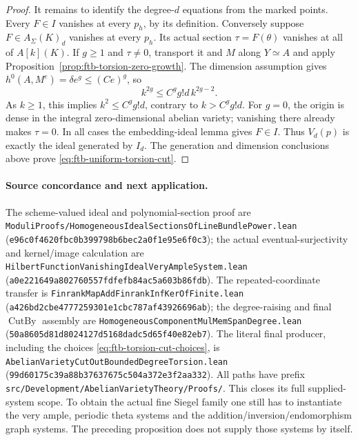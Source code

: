 \begin{proof}
It remains to identify the degree-\(d\) equations from
the marked points.
Every \(F\in I\) vanishes at every \(p_h\), by its
definition.
Conversely suppose \(F\in A_\Sigma(K)_d\) vanishes at
every \(p_h\).
Its actual section \(\tau=F(\theta)\) vanishes at all
of \(A[k](K)\).
If \(g\ge1\) and \(\tau\ne0\), transport it and \(M\)
along \(Y\simeq A\) and apply
Proposition~\ref{prop:ftb-torsion-zero-growth}.
The dimension assumption gives
\(h^0(A,M^e)=\delta e^g\le(Ce)^g\), so
\[
                       k^{2g}\le C^g g!d\,k^{2g-2}.
\]
As \(k\ge1\), this implies \(k^2\le C^g g!d\),
contrary to \(k>C^g g!d\).
For \(g=0\), the origin is dense in the integral
zero-dimensional abelian variety; vanishing there
already makes \(\tau=0\).
In all cases the embedding-ideal lemma gives \(F\in I\).
Thus \(V_d(p)\) is exactly the ideal generated by \(I_d\).
The generation and dimension conclusions above prove
\eqref{eq:ftb-uniform-torsion-cut}.
\end{proof}

\paragraph{Source concordance and next application.}
The scheme-valued ideal and polynomial-section proof are
\texttt{ModuliProofs/HomogeneousIdealSectionsOfLineBundlePower.lean}
(\texttt{e96c0f4620fbc0b399798b6bec2a0f1e95e6f0c3});
the actual eventual-surjectivity and kernel/image calculation are
\texttt{HilbertFunctionVanishingIdealVeryAmpleSystem.lean}
(\texttt{a0e221649a802760557fdfefb84ac5a603b86fdb}).
The repeated-coordinate transfer is
\texttt{FinrankMapAddFinrankInfKerOfFinite.lean}
(\texttt{a426bd2cbe4777259301e1cbc787af43926696ab});
the degree-raising and final \(\operatorname{CutBy}\) assembly are
\texttt{HomogeneousComponentMulMemSpanDegree.lean}
(\texttt{50a8605d81d8024127d5168dadc5d65f40e82eb7}).
The literal final producer, including the choices
\eqref{eq:ftb-torsion-cut-choices}, is
\texttt{AbelianVarietyCutOutBoundedDegreeTorsion.lean}
(\texttt{99d60175c39a88b37637675c504a372e3f2aa332}).
All paths have prefix
\texttt{src/Development/AbelianVarietyTheory/Proofs/}.
This closes its full supplied-system scope.
To obtain the actual fine Siegel family one still has
to instantiate the very ample, periodic theta systems
and the addition/inversion/endomorphism graph systems.
The preceding proposition does not supply those systems
by itself.
